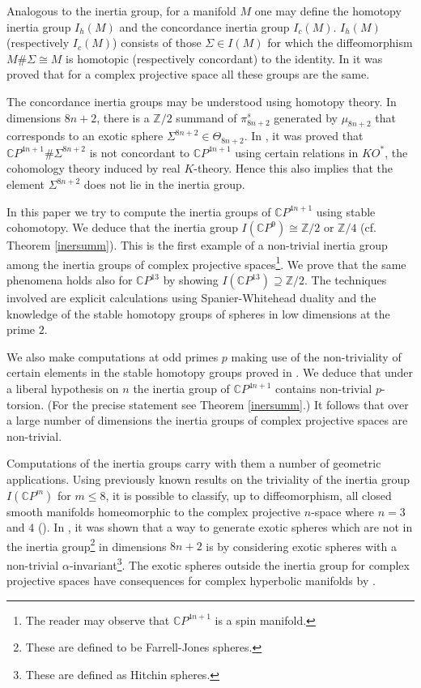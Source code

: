 \documentclass[a4paper,leqno,12pt]{amsart}
\theoremstyle{plain}
\theoremstyle{definition}
\numberwithin{equation}{section}
\begin{document}
Analogous to the inertia group, for a manifold $M$ one may define the homotopy inertia group $I_h(M)$ and the concordance inertia group $I_c(M)$. $I_h(M)$ (respectively $I_c(M)$) consists of those $\Sigma \in I(M)$  for which the diffeomorphism $M\# \Sigma\cong M$ is homotopic (respectively concordant) to the identity. In \cite{Ram14} it was proved that for a complex projective space all these groups are the same. 

The concordance inertia groups may be understood using homotopy theory. In dimensions $8n+2$, there is a ${\mathbb{Z}}/2$ summand of $\pi_{8n+2}^s$ generated by $\mu_{8n+2}$ that corresponds to an exotic sphere $\Sigma^{8n+2}\in \Theta_{8n+2}$. In \cite{Far-Jon}, it was proved that ${\mathbb{C}} P^{4n+1} \# \Sigma^{8n+2}$ is not concordant to ${\mathbb{C}} P^{4n+1}$ using certain relations in $KO^*$, the cohomology theory induced by real $K$-theory. Hence this also implies that the element $\Sigma^{8n+2}$ does not lie in the inertia group.  

In this paper we try to compute the inertia groups of ${\mathbb{C}} P^{4n+1}$ using stable cohomotopy. We deduce that the inertia group $I({\mathbb{C}} P^9)\cong {\mathbb{Z}}/2$ or ${\mathbb{Z}}/4$ (cf. Theorem \ref{inersumm}). This is the first example of a non-trivial inertia group among the inertia groups of complex projective spaces\footnote{The reader may observe that ${\mathbb{C}} P^{4n+1}$ is a spin manifold.}. We prove that the same phenomena holds also for ${\mathbb{C}} P^{13}$ by showing $I({\mathbb{C}} P^{13}) \supseteq {\mathbb{Z}}/2$. The techniques involved are explicit calculations using Spanier-Whitehead duality and the knowledge of the stable homotopy groups of spheres in low dimensions at the prime $2$. 

We also make computations at odd primes $p$ making use of the non-triviality of certain elements in the stable homotopy groups proved in \cite{CNL96}. We deduce that under a liberal hypothesis on $n$ the inertia group of ${\mathbb{C}} P^{4n+1}$ contains non-trivial $p$-torsion. (For the precise statement see Theorem \ref{inersumm}.) It follows that over a large number of dimensions the inertia groups of complex projective spaces are non-trivial.

Computations of the inertia groups carry with them a number of geometric applications. Using previously known results on the triviality of the inertia group $I({\mathbb{C}} P^m)$ for $m\leq 8$,  it is possible to classify, up to diffeomorphism, all closed smooth manifolds homeomorphic to the complex projective $n$-space where $n=3$ and $4$ (\cite{Ram15}). In \cite{Ram14}, it was shown that a way to generate exotic spheres which are not in the inertia group\footnote{These are defined to be Farrell-Jones spheres.} in dimensions $8n+2$ is by considering exotic spheres with a non-trivial $\alpha$-invariant\footnote{These are defined as Hitchin spheres.}. The exotic spheres outside the inertia group for complex projective spaces have consequences for complex hyperbolic manifolds by \cite{Far-Jon}. 
\end{document}
